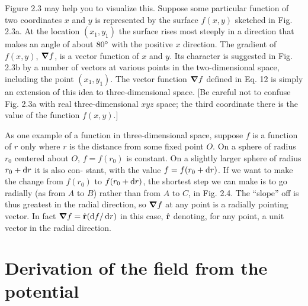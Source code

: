Figure 2.3 may help you to visualize this. Suppose some particular
function of two coordinates $x$ and $y$ is represented by the surface
$f(x,y)$ sketched in Fig. 2.3a. At the location $(x_1,y_1)$ the surface rises
most steeply in a direction that makes an angle of about $80\mspace{0mu}^\circ$ with the
positive $x$ direction. The gradient of $f(x,y)$, $\boldsymbol{\nabla} f$, is a vector function
of $x$ and $y$. Its character is suggested in Fig. 2.3b by a number of
vectors at various points in the two-dimensional space, including the
point $(x_1,y_1)$. The vector function $\boldsymbol{\nabla} f$ defined in Eq. 12 is simply an
extension of this idea to three-dimensional space. [Be careful not to
confuse Fig. 2.3a with real three-dimensional $xyz$ space; the third
coordinate there is the value of the function $f(x,y)$.]

As one example of a function in three-dimensional space, suppose
$f$ is a function of $r$ only where $r$ is the distance from some fixed
point $O$. On a sphere of radius $r_0$ centered about $O$, $f = f(r_0)$ is
constant. On a slightly larger sphere of radius $r_0 + \operatorname{d\!} r$ it is also con-
stant, with the value $f = f(r_0 + \operatorname{d\!} r)$. If we want to make the change
from $f(r_0)$ to $f(r_0 + \operatorname{d\!} r)$, the shortest step we can make is to go
radially (as from $A$ to $B$) rather than from $A$ to $C$, in Fig. 2.4. The
``slope'' off is thus greatest in the radial direction, so $\boldsymbol{\nabla} f$ at any point
is a radially pointing vector. In fact $\boldsymbol{\nabla} f = \hat{\mathbf{r}} (\operatorname{d\!} f/\operatorname{d\!} r)$ in this case,
$\hat{\mathbf{r}}$ denoting, for any point, a unit vector in the radial direction.

\section{Derivation of the field from the potential}

